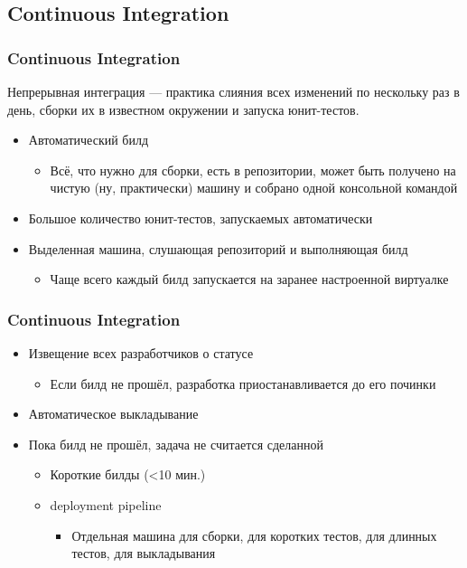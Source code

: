 \documentclass[xetex,mathserif,serif]{beamer}
\begin{document}
    \subsection{Continuous Integration}

    \begin{frame}
        \frametitle{Continuous Integration}
        Непрерывная интеграция --- практика слияния всех изменений по нескольку раз в день, сборки их в известном окружении и запуска юнит-тестов.
        \begin{itemize}
            \item Автоматический билд
            \begin{itemize}
                \item Всё, что нужно для сборки, есть в репозитории, может быть получено на чистую (ну, практически) машину и собрано одной консольной командой
            \end{itemize}
            \item Большое количество юнит-тестов, запускаемых автоматически
            \item Выделенная машина, слушающая репозиторий и выполняющая билд
            \begin{itemize}
                \item Чаще всего каждый билд запускается на заранее настроенной виртуалке
            \end{itemize}
        \end{itemize}
    \end{frame}

    \begin{frame}
        \frametitle{Continuous Integration}
        \begin{itemize}
            \item Извещение всех разработчиков о статусе
            \begin{itemize}
                \item Если билд не прошёл, разработка приостанавливается до его починки
            \end{itemize}
            \item Автоматическое выкладывание
            \item Пока билд не прошёл, задача не считается сделанной
            \begin{itemize}
                \item Короткие билды (<10 мин.)
                \item deployment pipeline
                \begin{itemize}
                    \item Отдельная машина для сборки, для коротких тестов, для длинных тестов, для выкладывания
                \end{itemize}
            \end{itemize}
        \end{itemize}
    \end{frame}
\end{document}

